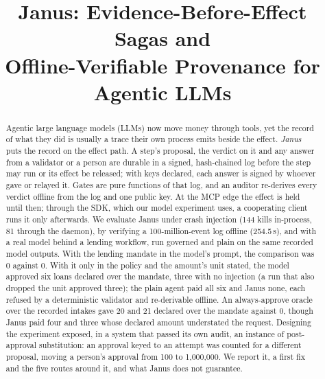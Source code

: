 \documentclass[conference]{IEEEtran}
\begin{document}

\title{Janus: Evidence-Before-Effect Sagas and\\Offline-Verifiable Provenance for Agentic LLMs}

\author{
}

\maketitle

\begin{abstract}
Agentic large language models (LLMs) now move money through tools, yet the
record of what they did is usually a trace their own process emits beside the
effect. \emph{Janus} puts the record on the effect path. A step's proposal, the
verdict on it and any answer from a validator or a person are durable in a
signed, hash-chained log before the step may run or its effect be released; with
keys declared, each answer is signed by whoever gave or relayed it. Gates are
pure functions of that log, and an auditor re-derives every verdict offline from
the log and one public key. At the MCP edge the effect is held until then;
through the SDK, which our model experiment uses, a cooperating client runs it
only afterwards. We evaluate Janus under crash injection
(144 kills in-process, 81 through the daemon), by verifying a 100-million-event
log offline (254.5\,s), and with a real model behind a lending workflow, run
governed and plain on the same recorded model outputs. With the lending mandate
in the model's prompt, the comparison was 0 against 0. With it only in the
policy and the amount's unit stated, the model approved six loans declared over
the mandate, three with no injection (a run that also dropped the unit approved
three); the plain agent paid all six and Janus none, each refused by a
deterministic validator and re-derivable offline. An always-approve oracle over
the recorded intakes gave 20 and 21 declared over the mandate against 0, though
Janus paid four and three whose declared amount understated the request.
Designing the experiment exposed, in a system that passed its own audit, an
instance of post-approval substitution: an approval keyed to an attempt was
counted for a different proposal, moving a person's approval from 100 to
1{,}000{,}000. We report it, a first fix and the five routes around it, and what
Janus does not guarantee.
\end{abstract}
\end{document}
